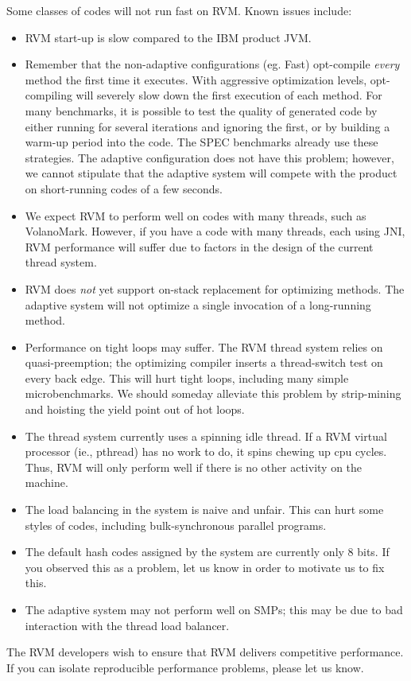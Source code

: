 Some classes of codes will not run fast on RVM.  Known issues include:
\begin{itemize}
\item RVM start-up is slow compared to the IBM product JVM.
\item Remember that the non-adaptive configurations (eg. Fast) opt-compile
{\em every} method the first time it executes.  With aggressive optimization
levels, opt-compiling will severely slow down the first execution of
each method.  For many benchmarks, it is possible to test the quality
of generated code by either running for several iterations and ignoring
the first, or by building a warm-up period into the code.  The SPEC benchmarks
already use these strategies.  The adaptive configuration does not
have this problem; however, we cannot stipulate that the adaptive
system will compete with the product on short-running codes of a few seconds.
\item We expect RVM to perform well on codes with many threads, such as
VolanoMark.  However, if you have a code with many threads, each using
JNI, RVM performance will suffer due to factors in the design of
the current thread system.
\item RVM does {\em not} yet support on-stack replacement for
optimizing methods.  The adaptive system will not optimize a single
invocation of a long-running 
method.
\item Performance on tight loops may suffer.  The RVM thread system
relies on quasi-preemption; the optimizing compiler inserts a thread-switch
test on every back edge.  This will hurt tight loops, including many
simple microbenchmarks.  We should someday alleviate this problem by
strip-mining and hoisting the yield point out of hot loops.
\item The thread system currently uses a spinning idle thread. If a RVM
virtual processor (ie., pthread) has no work to do, it spins chewing up
cpu cycles.  Thus, RVM will only perform well if there is no other activity on the machine.
\item The load balancing in the system is naive and unfair.  This can hurt some styles of codes, including bulk-synchronous parallel programs.
\item The default hash codes assigned by the system are currently only 8
bits.  If you observed this as a problem, let us know in order to motivate
us to fix this.
\item The adaptive system may not perform well on SMPs; this may be due to bad
interaction with the thread load balancer.
\end{itemize}

The RVM developers wish to ensure that RVM delivers competitive performance.
If you can isolate reproducible performance problems, please let us
know. 

\AIXTMFooter